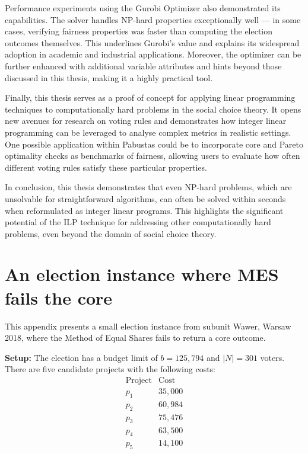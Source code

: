 \documentclass[magisterska,en]{pracamgr}
\begin{document}
Performance experiments using the Gurobi Optimizer also demonstrated its capabilities. The solver handles NP-hard properties exceptionally well --- in some cases, verifying fairness properties was faster than computing the election outcomes themselves. This underlines Gurobi's value and explains its widespread adoption in academic and industrial applications. Moreover, the optimizer can be further enhanced with additional variable attributes and hints beyond those discussed in this thesis, making it a highly practical tool.

Finally, this thesis serves as a proof of concept for applying linear programming techniques to computationally hard problems in the social choice theory. It opens new avenues for research on voting rules and demonstrates how integer linear programming can be leveraged to analyse complex metrics in realistic settings. One possible application within Pabustas could be to incorporate core and Pareto optimality checks as benchmarks of fairness, allowing users to evaluate how often different voting rules satisfy these particular properties.

In conclusion, this thesis demonstrates that even NP-hard problems, which are unsolvable for straightforward algorithms, can often be solved within seconds when reformulated as integer linear programs. This highlights the significant potential of the ILP technique for addressing other computationally hard problems, even beyond the domain of social choice theory.

\appendix

\chapter{An election instance where MES fails the core}
\label{appendix:A}

This appendix presents a small election instance from subunit Wawer, Warsaw 2018, where the Method of Equal Shares fails to return a core outcome.

\textbf{Setup:}
The election has a budget limit of $b=125{,}794$ and $|N|=301$ voters. There are five candidate projects with the following costs:
$$
\begin{array}{ll}
    \text{Project} & \text{Cost} \\
    \hline
    p_1 & 35{,}000 \\
    p_2 & 60{,}984 \\
    p_3 & 75{,}476 \\
    p_4 & 63{,}500 \\
    p_5 & 14{,}100
\end{array}
$$
\end{document}
